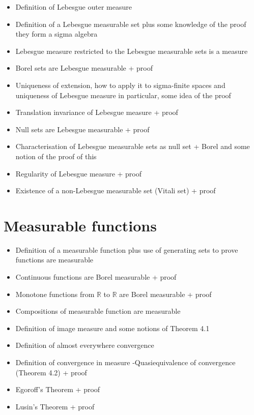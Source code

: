 \documentclass[
]{book}
\providecommand{\tightlist}{%
  \setlength{\itemsep}{0pt}\setlength{\parskip}{0pt}}
\theoremstyle{definition}
\theoremstyle{definition}
\theoremstyle{definition}
\theoremstyle{definition}
\theoremstyle{remark}
\begin{document}
\begin{itemize}
\tightlist
\item
  Definition of Lebesgue outer measure
\item
  Definition of a Lebesgue measurable set plus some knowledge of the proof they form a sigma algebra
\item
  Lebesgue measure restricted to the Lebesgue measurable sets is a measure
\item
  Borel sets are Lebesgue measurable + proof
\item
  Uniqueness of extension, how to apply it to sigma-finite spaces and uniqueness of Lebesgue measure in particular, some idea of the proof
\item
  Translation invariance of Lebesgue measure + proof
\item
  Null sets are Lebesgue measurable + proof
\item
  Characterisation of Lebesgue measurable sets as null set + Borel and some notion of the proof of this
\item
  Regularity of Lebesgue measure + proof
\item
  Existence of a non-Lebesgue measurable set (Vitali set) + proof
\end{itemize}

\hypertarget{measurable-functions}{%
\section{Measurable functions}\label{measurable-functions}}

\begin{itemize}
\tightlist
\item
  Definition of a measurable function plus use of generating sets to prove functions are measurable
\item
  Continuous functions are Borel measurable + proof
\item
  Monotone functions from \(\mathbb{R}\) to \(\mathbb{R}\) are Borel measurable + proof
\item
  Compositions of measurable function are measurable
\item
  Definition of image measure and some notions of Theorem 4.1
\item
  Definition of almost everywhere convergence
\item
  Definition of convergence in measure
  -Quasiequivalence of convergence (Theorem 4.2) + proof
\item
  Egoroff's Theorem + proof
\item
  Lusin's Theorem + proof
\end{itemize}
\end{document}

